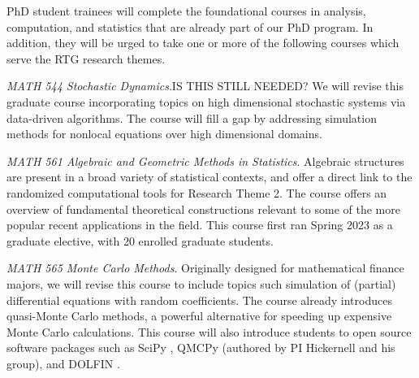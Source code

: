 \documentclass[11pt]{NSFamsart}
\begin{document}

PhD student trainees will complete the foundational courses in analysis, computation, and statistics that are already part of our PhD program.  In addition, they will be urged to take one or more of the following courses which serve the RTG research themes.  

\emph{MATH 544 Stochastic Dynamics}.{\color{red}IS THIS STILL NEEDED?}
We will revise this graduate course  incorporating topics on  high dimensional stochastic systems via data-driven algorithms.  The course will fill a gap by addressing simulation methods for nonlocal equations over high dimensional domains.

\emph{MATH 561 Algebraic and Geometric Methods in Statistics}. Algebraic structures are present in a broad variety of statistical contexts, and offer a direct link to the randomized computational tools for Research Theme 2. The course offers an overview of fundamental theoretical constructions relevant to some of the more popular recent applications in the field. This course first ran Spring 2023 as a graduate elective, with 20 enrolled graduate students. 

\emph{MATH 565 Monte Carlo Methods}. Originally designed for mathematical finance majors, we will revise this course to include topics such simulation of (partial) differential equations with random coefficients.  The course already introduces quasi-Monte Carlo methods, a powerful alternative for speeding up expensive Monte Carlo calculations.  This course will also introduce students to open source software packages such as SciPy \cite{virtanen2020scipy}, QMCPy \cite{QMCPy2020a} (authored by PI Hickernell and his group), and DOLFIN \cite{Dolphin12}. 
\end{document}
